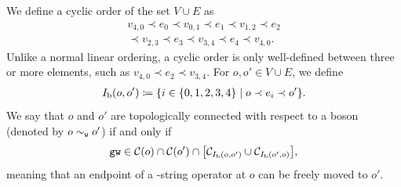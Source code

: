 \documentclass[
 prx,
 reprint,
 superscriptaddress,
 longbibliography,
 dvipsnames
]{revtex4-2}
\begin{document}
We define a cyclic order of the set $V \cup E$ as 
\begin{multline*}
    v_{4,0} \prec e_0 \prec v_{0,1} \prec e_1 \prec v_{1,2} \prec e_2 \\
    \prec v_{2,3} \prec e_3 \prec v_{3,4} \prec e_4 \prec v_{4,0}.
\end{multline*}
Unlike a normal linear ordering, a cyclic order is only well-defined between three or more elements, such as $v_{4,0} \prec e_2 \prec v_{3,4}$.
For $o, o' \in V \cup E$, we define
\begin{align*}
    I_{\mathrm{b}}\qty(o, o') \coloneqq \qty{i \in \qty{0, 1, 2, 3, 4} \mid o \prec e_i \prec o'}.
\end{align*}
We say that $o$ and $o'$ are topologically connected with respect to a \gw boson (denoted by $o \sim_{\texttt{w}} o'$) if and only if
\begin{align*}
    \texttt{gw} \in \mathcal{C}\qty(o) \cap \mathcal{C}\qty(o') \cap \qty[\mathcal{C}_{I_{\mathrm{b}}\qty(o, o')} \cup \mathcal{C}_{I_{\mathrm{b}}\qty(o', o)}],
\end{align*}
meaning that an endpoint of a \gw-string operator at $o$ can be freely moved to $o'$.

\end{document}
